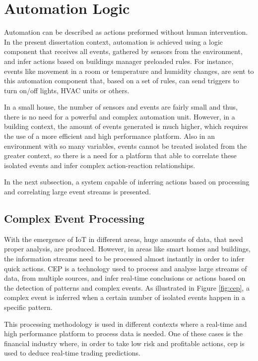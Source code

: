 \section{Automation Logic}
Automation can be described as actions preformed without human intervention. In the present dissertation context, automation is achieved using a logic component that receives all events, gathered by sensors from the environment, and infer actions based on buildings manager preloaded rules. For instance, events like movement in a room or temperature and humidity changes, are sent to this automation component that, based on a set of rules, can send triggers to turn on/off lights, HVAC units or others.

In a small house, the number of sensors and events are fairly small and thus, there is no need for a powerful and complex automation unit. However, in a building context, the amount of events generated is much higher, which requires the use of a more efficient and high performance platform. Also in an environment with so many variables, events cannot be treated isolated from the greater context, so there is a need for a platform that able to correlate these isolated events and infer complex action-reaction relationships.


In the next subsection, a system capable of inferring actions based on processing and correlating large event streams is presented.


\subsection{Complex Event Processing}

With the emergence of IoT in different areas, huge amounts of data, that need proper analysis, are produced. However, in areas like smart homes and buildings, the information streams need to be processed almost instantly in order to infer quick actions. CEP is a technology used to process and analyse large streams of data, from multiple sources, and infer real-time conclusions or actions based on the detection of patterns and complex events. As illustrated in Figure \ref{fig:cep}, a complex event is inferred when a certain number of isolated events happen in a specific pattern.  




This processing methodology is used in different contexts where a real-time and high performance platform to process data is needed. One of these cases is the financial industry where, in order to take low risk and profitable actions, \ac{cep} is used to deduce real-time trading predictions.

